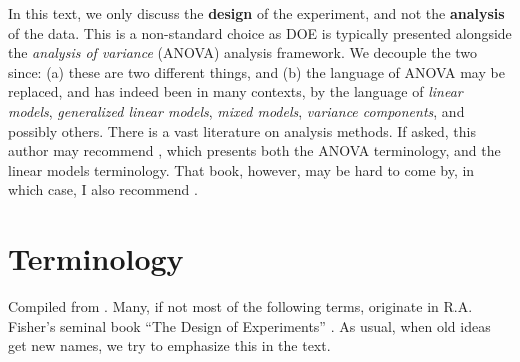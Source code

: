 \begin{remark}
In this text, we only discuss the \textbf{design} of the experiment, and not the \textbf{analysis} of the data.
This is a non-standard choice as DOE is typically presented alongside the \emph{analysis of variance} (ANOVA) analysis framework.
We decouple the two since: 
(a) these are two different things, and 
(b) the language of ANOVA may be replaced, and has indeed been in many contexts, by the language of \emph{linear models}, \emph{generalized linear models}, \emph{mixed models}, \emph{variance components}, and possibly others. 
There is a vast literature on analysis methods. 
If asked, this author may recommend \cite{hocking_analysis_1985}, which presents both the ANOVA terminology, and the linear models terminology.
That book, however, may be hard to come by, in which case, I also recommend \cite{mason_statistical_2003}.
\end{remark}





\section{Terminology}
Compiled from \cite{mason_statistical_2003}. Many, if not most of the following terms, originate in R.A. Fisher's seminal book ``The Design of Experiments'' \citep{fisher_design_1960}. As usual, when old ideas get new names, we try to emphasize this in the text.



